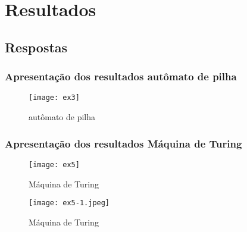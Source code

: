 \documentclass[
	12pt,				%
	openright,			%
	twoside,			%
	a4paper,			%
	english,			%
	french,				%
	spanish,			%
	brazil,				%
	]{abntex2}
\begin{document}


\part{Resultados}
\chapter{Respostas}

\section{Apresentação dos resultados autômato de pilha}

\begin{figure}[h]
  \begin{center}
    \texttt{[image: ex3]} \\
    \caption{autômato de pilha} \label{r7}

  \end{center}
 \end{figure}



\section{Apresentação dos resultados Máquina de Turing}

\begin{figure}[h]
  \begin{center}
    \texttt{[image: ex5]} \\
    \caption{Máquina de Turing} \label{r2}

  \end{center}
\end{figure}

\begin{figure}[h]
  \begin{center}
    \texttt{[image: ex5-1.jpeg]} \\
    \caption{Máquina de Turing} \label{r2-1}

  \end{center}
\end{figure}
\end{document}
